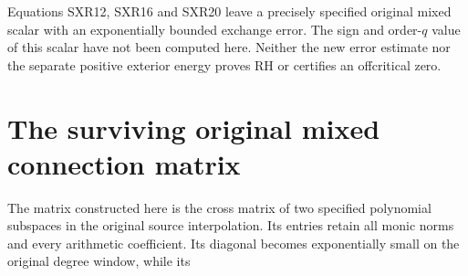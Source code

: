 Equations SXR12, SXR16 and SXR20 leave a precisely specified original
mixed scalar with an exponentially bounded exchange error. The sign
and order-$q$ value of this scalar have not been computed here.
Neither the new error estimate nor the separate positive exterior
energy proves RH or certifies an offcritical zero.
\endgroup


\begingroup
\section{The surviving original mixed connection matrix}
\label{sec:CMX}

The matrix constructed here is the cross matrix of two specified
polynomial subspaces in the original source interpolation. Its entries
retain all monic norms and every arithmetic coefficient. Its diagonal
becomes exponentially small on the original degree window, while its
